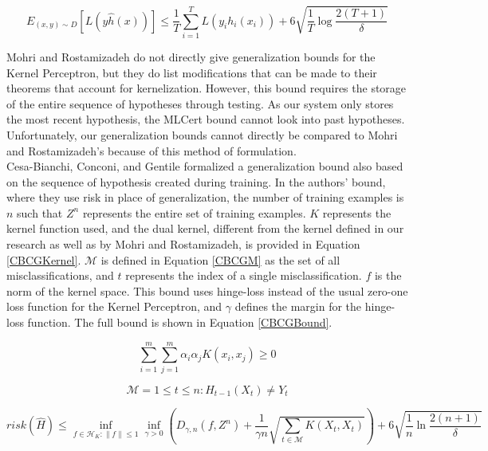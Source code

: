 \begin{equation} \label{MRBound}
 E_{(x,y)\sim D}[L(y\hat{h}(x))] \leq \frac{1}{T} \sum_{i=1}^{T} L(y_i h_i(x_i)) + 6\sqrt{\frac{1}{T}\log \frac{2(T+1)}{\delta}} 
\end{equation}

Mohri and Rostamizadeh do not directly give generalization bounds for the Kernel Perceptron, but they do list modifications that can be made to their theorems that account for kernelization. However, this bound requires the storage of the entire sequence of hypotheses through testing. As our system only stores the most recent hypothesis, the MLCert bound cannot look into past hypotheses. Unfortunately, our generalization bounds cannot directly be compared to Mohri and Rostamizadeh's because of this method of formulation.
\\Cesa-Bianchi, Conconi, and Gentile \cite{CBCG04} formalized a generalization bound also based on the sequence of hypothesis created during training. In the authors' bound, where they use risk in place of generalization, the number of training examples is $n$ such that $Z^n$ represents the entire set of training examples. $K$ represents the kernel function used, and the dual kernel, different from the kernel defined in our research as well as by Mohri and Rostamizadeh, is provided in Equation \ref{CBCGKernel}. $\mathcal{M}$ is defined in Equation \ref{CBCGM} as the set of all misclassifications, and $t$ represents the index of a single misclassification. $f$ is the norm of the kernel space. This bound uses hinge-loss instead of the usual zero-one loss function for the Kernel Perceptron, and $\gamma$ defines the margin for the hinge-loss function. The full bound is shown in Equation \ref{CBCGBound}.

\begin{equation}\label{CBCGKernel}
 \sum_{i=1}^{m}\sum_{j=1}^{m} \alpha_i \alpha_j K(x_i, x_j) \geq 0
\end{equation}

\begin{equation}\label{CBCGM}
 \mathcal{M} = {1 \leq t \leq n : H_{t-1}(X_t) \neq Y_t}
\end{equation}

\begin{equation}\label{CBCGBound}
 risk(\hat{H}) \leq \inf_{f\in \mathcal{H}_K:\|f\|\leq1} \inf_{\gamma > 0} \left(D_{\gamma,n}(f, Z^n) + \frac{1}{\gamma n} \sqrt{\sum_{t \in \mathcal{M}} K(X_t, X_t)}\right) + 6\sqrt{\frac{1}{n}\ln \frac{2(n+1)}{\delta}}
\end{equation}

